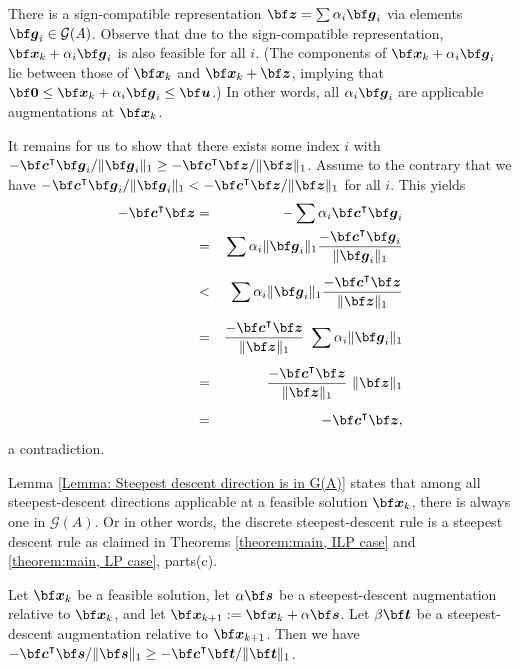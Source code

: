 \documentclass[moor]{informs1hack}              %
\def\Graver{{\mathcal G}}
\def\ve#1{\mathchoice{\mbox{\boldmath$\displaystyle\bf#1$}}
{\mbox{\boldmath$\textstyle\bf#1$}}
{\mbox{\boldmath$\scriptstyle\bf#1$}}
{\mbox{\boldmath$\scriptscriptstyle\bf#1$}}}
\newcommand\vecc{{\ve c}}
\newcommand\veg{{\ve g}}
\newcommand\ves{{\ve s}}
\newcommand\vet{{\ve t}}
\newcommand\veu{{\ve u}}
\newcommand\vex{{\ve x}}
\newcommand\vez{{\ve z}}
\newcommand{\T}{{\intercal}} %
\begin{document}
  There is a sign-compatible representation $\vez=\sum\alpha_i\veg_i$  via elements $\veg_i\in\Graver(A)$. Observe that due to the sign-compatible representation, $\vex_k+\alpha_i\veg_i$ is also feasible for all $i$. (The components of $\vex_k+\alpha_i\veg_i$ lie between those of $\vex_k$ and $\vex_k+\vez$, implying that $\ve 0\leq\vex_k+\alpha_i\veg_i\leq\veu$.) In other words, all $\alpha_i\veg_i$ are applicable augmentations at $\vex_k$.

  It remains for us to show that there exists some index $i$ with $-\vecc^\T\veg_i/\|\veg_i\|_1\geq-\vecc^\T\vez/\|\vez\|_1$. Assume to the contrary that we have $-\vecc^\T\veg_i/\|\veg_i\|_1 < -\vecc^\T\vez/\|\vez\|_1$ for all $i$. This yields
  \begin{eqnarray*}
    -\vecc^\T\vez & = &- \sum\alpha_i\vecc^\T\veg_i\\
    & = & \sum\alpha_i\|\veg_i\|_1\frac{-\vecc^\T\veg_i}{\|\veg_i\|_1}\\[5pt]
    & < & \sum\alpha_i\|\veg_i\|_1\frac{-\vecc^\T\vez}{\|\vez\|_1}\\[5pt]
    & = & \frac{-\vecc^\T\vez}{\|\vez\|_1}\ \sum\alpha_i\|\veg_i\|_1\\[5pt]
    & = & \frac{-\vecc^\T\vez}{\|\vez\|_1}\ \|\vez\|_1\\[5pt]
    & = & -\vecc^\T\vez,
  \end{eqnarray*}
  a contradiction.
 \Halmos
\endproof

Lemma \ref{Lemma: Steepest descent direction is in G(A)} states that among all steepest-descent directions applicable at a feasible solution $\vex_k$, there is always one in $\Graver(A)$. Or in other words, the discrete steepest-descent rule is a steepest descent rule as claimed in Theorems \ref{theorem:main, ILP case} and \ref{theorem:main, LP case}, parts(c).

\begin{lemma}\label{Lemma: monotonicity}
  Let $\vex_k$ be a feasible solution, let $\alpha\ves$ be a steepest-descent augmentation relative to $\vex_k$, and let $\vex_{k+1}:=\vex_k + \alpha\ves$.
  Let  $\beta\vet$ be a steepest-descent augmentation relative to $\vex_{k+1}$.
  Then we have $-\vecc^\T\ves/\|\ves\|_1\geq -\vecc^\T\vet/\|\vet\|_1$.
\end{lemma}
\end{document}
